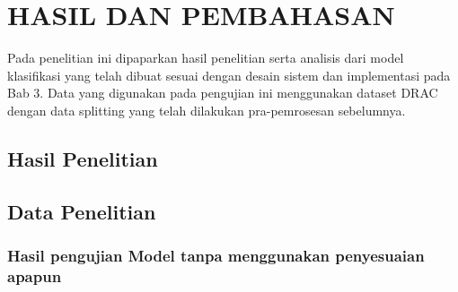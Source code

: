 \chapter{HASIL DAN PEMBAHASAN}
Pada penelitian ini dipaparkan hasil penelitian serta analisis dari model klasifikasi yang telah dibuat sesuai dengan desain sistem dan implementasi pada Bab 3. Data yang digunakan pada pengujian ini menggunakan dataset DRAC dengan data splitting yang telah dilakukan pra-pemrosesan sebelumnya.
\section{Hasil Penelitian}

\section{Data Penelitian}
\subsection{Hasil pengujian Model tanpa menggunakan penyesuaian apapun}

